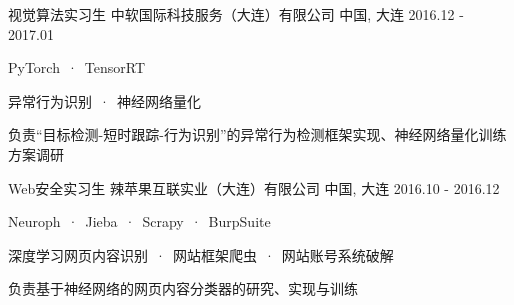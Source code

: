 

\begin{cventries}

  \cventrywork
    {视觉算法实习生} %
    {中软国际科技服务（大连）有限公司} %
    {中国, 大连} %
    {2016.12 - 2017.01} %
    {
      \begin{cvitems} %
        \item {PyTorch\ ·\ TensorRT}
        \item {异常行为识别\ ·\ 神经网络量化}
        \item {负责“目标检测-短时跟踪-行为识别”的异常行为检测框架实现、神经网络量化训练方案调研}
      \end{cvitems}
    }
    
  \cventrywork
    {Web安全实习生} %
    {辣苹果互联实业（大连）有限公司} %
    {中国, 大连} %
    {2016.10 - 2016.12} %
    {
      \begin{cvitems} %
        \item {Neuroph\ ·\ Jieba\ ·\ Scrapy\ ·\ BurpSuite}
        \item {深度学习网页内容识别\ ·\ 网站框架爬虫\ ·\ 网站账号系统破解}
        \item {负责基于神经网络的网页内容分类器的研究、实现与训练}
      \end{cvitems}
    }
    
\end{cventries}